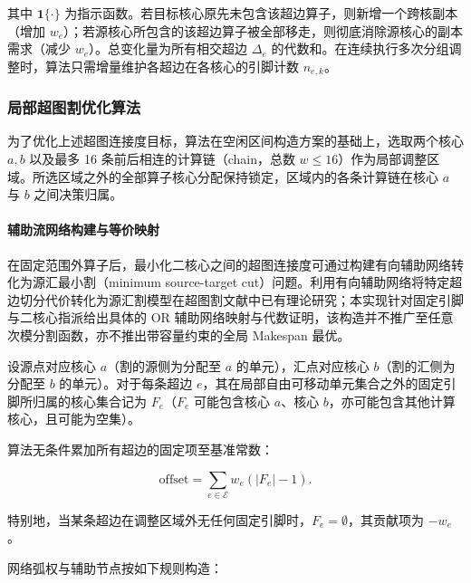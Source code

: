 \documentclass[anonymous,withtoc]{gmcm2026}
\begin{document}
其中 \(\mathbf{1}\{\cdot\}\) 为指示函数。若目标核心原先未包含该超边算子，则新增一个跨核副本（增加 \(w_e\)）；若源核心所包含的该超边算子被全部移走，则彻底消除源核心的副本需求（减少 \(w_e\)）。总变化量为所有相交超边 \(\Delta_e\) 的代数和。在连续执行多次分组调整时，算法只需增量维护各超边在各核心的引脚计数 \(n_{e, k}\)。

\subsubsection{局部超图割优化算法}

为了优化上述超图连接度目标，算法在空闲区间构造方案的基础上，选取两个核心 \(a, b\) 以及最多 16 条前后相连的计算链（chain，总数 \(w \le 16\)）作为局部调整区域。所选区域之外的全部算子核心分配保持锁定，区域内的各条计算链在核心 \(a\) 与 \(b\) 之间决策归属。

\paragraph{辅助流网络构建与等价映射}

在固定范围外算子后，最小化二核心之间的超图连接度可通过构建有向辅助网络转化为源汇最小割（minimum source-target cut）问题。利用有向辅助网络将特定超边切分代价转化为源汇割模型在超图割文献中已有理论研究\cite{ref8}；本实现针对固定引脚与二核心指派给出具体的 OR 辅助网络映射与代数证明，该构造并不推广至任意次模分割函数，亦不推出带容量约束的全局 Makespan 最优。

设源点对应核心 \(a\)（割的源侧为分配至 \(a\) 的单元），汇点对应核心 \(b\)（割的汇侧为分配至 \(b\) 的单元）。对于每条超边 \(e\)，其在局部自由可移动单元集合之外的固定引脚所归属的核心集合记为 \(F_e\)（\(F_e\) 可能包含核心 \(a\)、核心 \(b\)，亦可能包含其他计算核心，且可能为空集）。

算法无条件累加所有超边的固定项至基准常数：

\begin{equation}
\text{offset} = \sum_{e \in \mathcal{E}} w_e (|F_e| - 1).
\end{equation}

特别地，当某条超边在调整区域外无任何固定引脚时，\(F_e = \emptyset\)，其贡献项为 \(-w_e\)。

网络弧权与辅助节点按如下规则构造：
\end{document}
